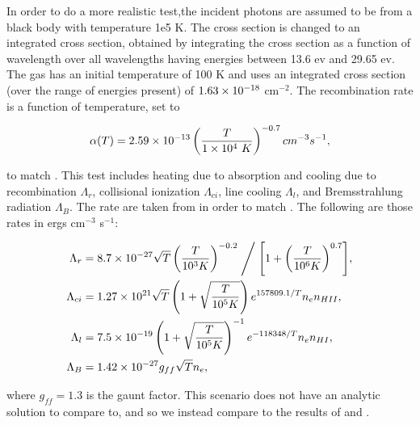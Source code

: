 In order to do a more realistic test,the incident photons are assumed to be from a black body with temperature 1e5 K. The cross section is changed to an integrated cross section, obtained by integrating the cross section as a function of wavelength over all wavelengths having energies between 13.6 ev and 29.65 ev. The gas has an initial temperature of 100 K and uses an integrated cross section (over the range of energies present) of $1.63\times 10^{-18}$ cm$^{-2}$. The recombination rate is a function of temperature, set to

\begin{equation}
\label{eq:recombpetkova}
\alpha(T) = 2.59\times 10^{-13}\left(\frac{T}{1\times 10^{4}~K}\right)^{-0.7} cm^{-3} s^{-1},
\end{equation}

\noindent
to match \citet{petkovaSpringel09}. This test includes heating due to absorption and cooling due to recombination $\Lambda_r$, collisional ionization $\Lambda_{ci}$, line cooling $\Lambda_l$, and Bremsstrahlung radiation $\Lambda_B$. The rate are taken from \citet{cen92} in order to match \citet{petkovaSpringel09}. The following are those rates in ergs cm$^{-3}$ s$^{-1}$:

\begin{align}
\label{eq:cencooling}
\Lambda_r & = {8.7\times 10^{-27} \sqrt{T}\left(\frac{T}{10^3 K}\right)^{-0.2}} \Biggm/{\left[1+\left(\frac{T}{10^6 K}\right)^{0.7}\right]}, \\
\Lambda_{ci} & = 1.27\times 10^{21} \sqrt{T}\left(1 + \sqrt{\frac{T}{10^5 K}}\right)e^{157809.1/T} n_e n_{HII},\\
\Lambda_l & = 7.5\times 10^{-19}\left(1+\sqrt{\frac{T}{10^5 K}}\right)^{-1}e^{-118348/T}n_e n_{HI},\\
\Lambda_B & = 1.42\times 10^{-27}g_{ff}\sqrt{T}n_e,
\end{align}

\noindent
where $g_{ff} = 1.3$ is the gaunt factor. This scenario does not have an analytic solution to compare to, and so we instead compare to the results of \citet{ilievEt06} and \citet{petkovaSpringel09}.


